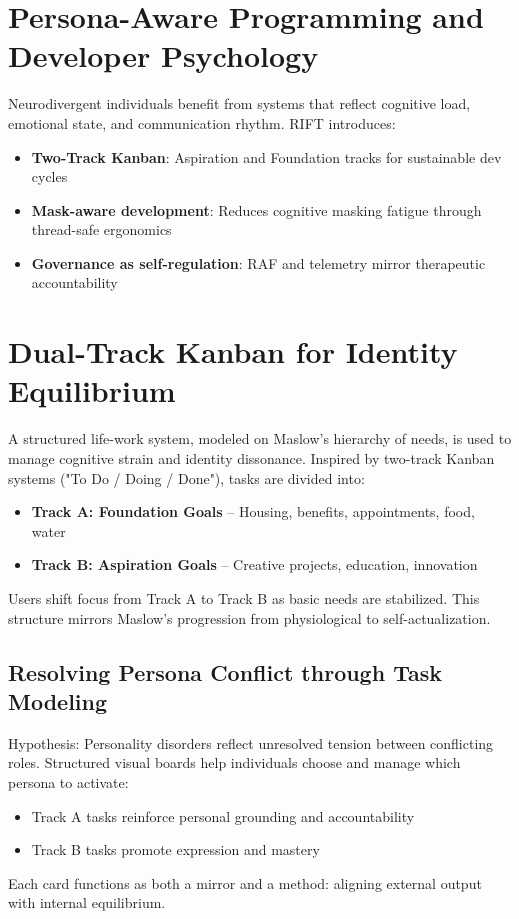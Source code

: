 \documentclass{article}
\begin{document}
\section{Persona-Aware Programming and Developer Psychology}
Neurodivergent individuals benefit from systems that reflect cognitive load, emotional state, and communication rhythm. RIFT introduces:
\begin{itemize}
    \item \textbf{Two-Track Kanban}: Aspiration and Foundation tracks for sustainable dev cycles
    \item \textbf{Mask-aware development}: Reduces cognitive masking fatigue through thread-safe ergonomics
    \item \textbf{Governance as self-regulation}: RAF and telemetry mirror therapeutic accountability
\end{itemize}

\section{Dual-Track Kanban for Identity Equilibrium}
A structured life-work system, modeled on Maslow's hierarchy of needs, is used to manage cognitive strain and identity dissonance. Inspired by two-track Kanban systems ("To Do / Doing / Done"), tasks are divided into:
\begin{itemize}
    \item \textbf{Track A: Foundation Goals} – Housing, benefits, appointments, food, water
    \item \textbf{Track B: Aspiration Goals} – Creative projects, education, innovation
\end{itemize}
Users shift focus from Track A to Track B as basic needs are stabilized. This structure mirrors Maslow’s progression from physiological to self-actualization.

\subsection{Resolving Persona Conflict through Task Modeling}
Hypothesis: Personality disorders reflect unresolved tension between conflicting roles. Structured visual boards help individuals choose and manage which persona to activate:
\begin{itemize}
    \item Track A tasks reinforce personal grounding and accountability
    \item Track B tasks promote expression and mastery
\end{itemize}
Each card functions as both a mirror and a method: aligning external output with internal equilibrium.
\end{document}
